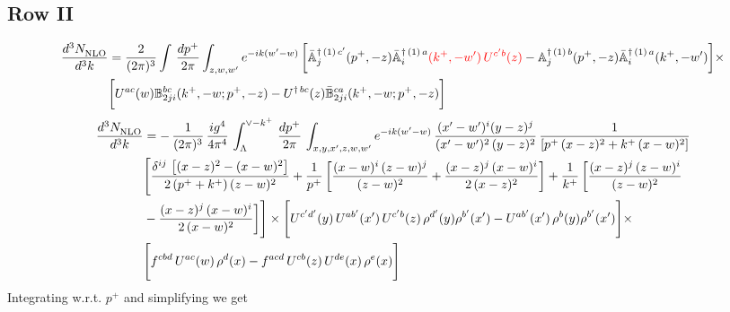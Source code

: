 \documentclass[9pt]{article}
\def\mf#1{\mathbb{#1}}
\numberwithin{equation}{section}
\newcommand{\chg}[1]{{\color{red}#1}}
\begin{document}
\subsection{Row II\,}
\begin{align}
    \frac{d^{3}N_{\rm NLO}^{\rm}}{d^{3}k}  & =    \frac{2}{(2\pi)^{3}} \int\, \frac{dp^{+}}{2\pi}\int_{z,w,w^{\prime}} e^{-ik(w^{\prime}-w)}\,\bigg[\Bar{\mf{A}}^{\dagger\,(1)\, c^{\prime}}_{j}(p^{+},-z)\Bar{\mf{A}}^{\dagger\, (1)\, a}_{i}\chg{(k^{+},-w^{\prime})\,U^{c^{\prime}b}(z)} - \mf{A}^{\dagger\, (1)\, b}_{j}(p^{+},- z)\Bar{\mf{A}}^{\dagger\, (1)\, a}_{i}(k^{+},- w^{\prime})\bigg] \times \notag \\ & \bigg[U^{ac}(w) \mf{B}^{bc}_{2ji}(k^{+},-w;p^{+},-z) -U^{\dagger\, bc}(z)\Bar{\mf{B}}^{ca}_{2ji}(k^{+},-w; p^{+},-z)\bigg] \nonumber
\end{align}
\begin{align}
    \frac{d^{3}N_{\rm NLO}^{\rm}}{d^{3}k}  & =  -\,\frac{1}{(2\pi)^{3}}\,\frac{ig^{4}}{4\pi^{4}}\,\int_{\Lambda}^{\vee-k^{+}}\,\frac{dp^{+}}{2\pi}\, \int_{x,y,x',z,w,w^{\prime}} e^{-ik(w^{\prime}-w)}\, \frac{(x'-w')^{i}(y-z)^{j}}{(x'-w')^{2}\,(y-z)^{2}}\, \frac{1}{\left[p^{+}\,(x-z)^{2}+k^{+}\,(x-w)^{2}\right]}\notag \\ & \Bigg[\frac{\delta^{ij}\, \left[(x-z)^{2}-(x-w)^{2}\right]}{2\, (p^{+}+k^{+})\,(z-w)^{2}}+\frac{1}{p^{+}}\, \bigg[\frac{(x-w)^{i}\,(z-w)^{j}}{(z-w)^{2}}+\frac{(x-z)^{j}\,(x-w)^{i}}{2\,(x-z)^{2}}\bigg]+\frac{1}{k^{+}}\,\bigg[\frac{(x-z)^{j}\,(z-w)^{i}}{(z-w)^{2}}\notag \\ & -\frac{(x-z)^{j}\,(x-w)^{i}}{2\,(x-w)^{2}}\bigg]\Bigg]\times \Bigg[U^{c'd'}(y)\,U^{ab'}(x')\,U^{c'b}(z)\,\rho^{d'}(y)\rho^{b'}(x')-U^{ab'}(x')\,\rho^{b}(y)\rho^{b'}(x')\Bigg]\times \notag \\ & \Bigg[f^{cbd}\,U^{ac}(w)\,\rho^{d}(x)-f^{acd}\, U^{cb}(z)\,U^{de}(x)\,\rho^{e}(x)\Bigg]
\end{align}
Integrating w.r.t. $p^{+}$ and simplifying we get
\end{document}
